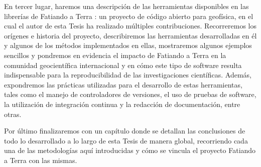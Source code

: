 En tercer lugar, haremos una descripción de las herramientas disponibles en las
librerías de Fatiando a Terra \citep{uieda2013}: un proyecto de código abierto
para geofísica, en el cual el autor de esta Tesis ha realizado múltiples
contribuciones.
Recorreremos los orígenes e historia del proyecto, describiremos las
herramientas desarrolladas en él y algunos de los métodos implementados en
ellas, mostraremos algunos ejemplos sencillos y pondremos en evidencia el
impacto de Fatiando a Terra en la comunidad geocientífica internacional y en
cómo este tipo de software resulta indispensable para la reproducibilidad de
las investigaciones científicas.
Además, expondremos las prácticas utilizadas para el desarrollo de estas
herramientas, tales como el manejo de controladores de versiones, el uso de
pruebas de software, la utilización de integración continua y la redacción de
documentación, entre otras.

Por último finalizaremos con un capítulo donde se detallan las
conclusiones de todo lo desarrollado a lo largo de esta Tesis de manera global,
recorriendo cada una de las metodologías aquí introducidas y cómo se
vincula el proyecto Fatiando a Terra con las mismas.
